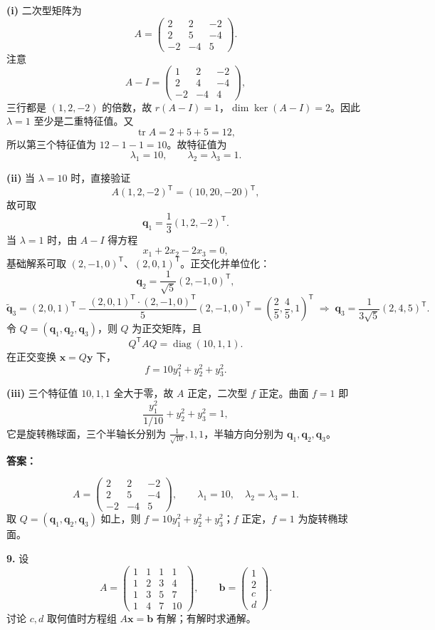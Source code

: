 \textbf{(i)} 二次型矩阵为
\[
A=\begin{pmatrix}
2&2&-2\\
2&5&-4\\
-2&-4&5
\end{pmatrix}.
\]
注意
\[
A-I=\begin{pmatrix}
1&2&-2\\
2&4&-4\\
-2&-4&4
\end{pmatrix},
\]
三行都是 \((1,2,-2)\) 的倍数，故 \(r(A-I)=1\)，\(\dim\ker(A-I)=2\)。因此 \(\lambda=1\) 至少是二重特征值。又
\[
\operatorname{tr}A=2+5+5=12,
\]
所以第三个特征值为 \(12-1-1=10\)。故特征值为
\[
\lambda_1=10,\qquad \lambda_2=\lambda_3=1.
\]

\textbf{(ii)} 当 \(\lambda=10\) 时，直接验证
\[
A(1,2,-2)^{\mathsf T}=(10,20,-20)^{\mathsf T},
\]
故可取
\[
\boldsymbol{q}_1=\frac13(1,2,-2)^{\mathsf T}.
\]
当 \(\lambda=1\) 时，由 \(A-I\) 得方程
\[
x_1+2x_2-2x_3=0,
\]
基础解系可取 \((2,-1,0)^{\mathsf T}\)、\((2,0,1)^{\mathsf T}\)。正交化并单位化：
\[
\boldsymbol{q}_2=\frac1{\sqrt5}(2,-1,0)^{\mathsf T},
\]
\[
\widetilde{\boldsymbol{q}}_3=(2,0,1)^{\mathsf T}
-\frac{(2,0,1)^{\mathsf T}\cdot(2,-1,0)^{\mathsf T}}{5}(2,-1,0)^{\mathsf T}
=\left(\frac25,\frac45,1\right)^{\mathsf T}
\;\Longrightarrow\;
\boldsymbol{q}_3=\frac1{3\sqrt5}(2,4,5)^{\mathsf T}.
\]
令 \(Q=(\boldsymbol{q}_1,\boldsymbol{q}_2,\boldsymbol{q}_3)\)，则 \(Q\) 为正交矩阵，且
\[
Q^{\mathsf T}AQ=\operatorname{diag}(10,1,1).
\]
在正交变换 \(\boldsymbol{x}=Q\boldsymbol{y}\) 下，
\[
f=10y_1^2+y_2^2+y_3^2.
\]

\textbf{(iii)} 三个特征值 \(10,1,1\) 全大于零，故 \(A\) 正定，二次型 \(f\) 正定。曲面 \(f=1\) 即
\[
\frac{y_1^2}{1/10}+y_2^2+y_3^2=1,
\]
它是旋转椭球面，三个半轴长分别为 \(\frac1{\sqrt{10}},1,1\)，半轴方向分别为 \(\boldsymbol{q}_1,\boldsymbol{q}_2,\boldsymbol{q}_3\)。

\textbf{答案：}

\[
A=\begin{pmatrix}2&2&-2\\2&5&-4\\-2&-4&5\end{pmatrix},
\qquad \lambda_1=10,\quad \lambda_2=\lambda_3=1.
\]
取 $Q=(\boldsymbol{q}_1,\boldsymbol{q}_2,\boldsymbol{q}_3)$ 如上，则 $f=10y_1^2+y_2^2+y_3^2$；$f$ 正定，$f=1$ 为旋转椭球面。
\else \answerarea[10] \fi%

\textbf{9.} 设
\[
A=\begin{pmatrix}
1&1&1&1\\
1&2&3&4\\
1&3&5&7\\
1&4&7&10
\end{pmatrix},\qquad
\boldsymbol{b}=\begin{pmatrix}1\\2\\c\\d\end{pmatrix}.
\]
讨论 \(c,d\) 取何值时方程组 \(A\boldsymbol{x}=\boldsymbol{b}\) 有解；有解时求通解。

